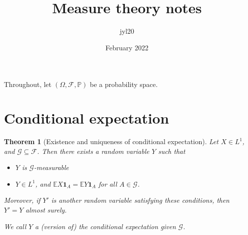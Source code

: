 \documentclass[parskip=full]{article}
\title{Measure theory notes}
\author{jyl20 }
\date{February 2022}
\newtheorem{theorem}{Theorem}[section]
\theoremstyle{definition}
\newcommand{\F}{\mathcal{F}}
\newcommand{\Pbb}{\mathbb{P}}
\newcommand{\1}{\mathbbm{1}}
\newcommand{\E}{\mathbb{E}}
\begin{document}
Throughout, let $(\Omega, \F, \Pbb)$ be a probability space.
\section{Conditional expectation}
\begin{theorem}[Existence and uniqueness of conditional expectation]
  Let $X \in L^1$, and $\mathcal{G} \subseteq \mathcal{F}$. Then there exists a random variable $Y$ such that
  \begin{itemize}
    \item $Y$ is $\mathcal{G}$-measurable
    \item $Y \in L^1$, and $\E X \mathbf{1}_A = \E Y \mathbf{1}_A$ for all $A \in \mathcal{G}$.
  \end{itemize}

  Moreover, if $Y'$ is another random variable satisfying these conditions, then $Y' = Y$ almost surely.

  We call $Y$ a (version of) the conditional expectation given $\mathcal{G}$.
\end{theorem}
\end{document}
